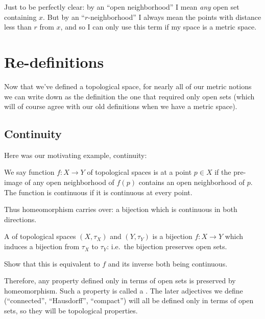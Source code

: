 \begin{abuse}
	Just to be perfectly clear:
	by an ``open neighborhood'' I mean \emph{any} open set containing $x$.
	But by an ``$r$-neighborhood'' I always mean the
	points with distance less than $r$ from $x$,
	and so I can only use this term if my space is a metric space.
\end{abuse}

\section{Re-definitions}
Now that we've defined a topological space,
for nearly all of our metric notions we can write down
as the definition the one that required only open sets
(which will of course agree with our old definitions
when we have a metric space).

\subsection{Continuity}
Here was our motivating example, continuity:
\begin{definition}
	We say function $f \colon X \to Y$ of topological spaces
	is  at a point $p \in X$ if the pre-image of any
	open neighborhood of $f(p)$ contains an open neighborhood of $p$.
	The function is continuous if it is continuous at every point.
\end{definition}

Thus homeomorphism carries over:
a bijection which is continuous in both directions.
\begin{definition}
	A  of topological spaces
	$(X, \tau_X)$ and $(Y, \tau_Y)$
	is a bijection $f \colon X \to Y$
	which induces a bijection from $\tau_X$ to $\tau_Y$:
	i.e.\ the bijection preserves open sets.
\end{definition}
\begin{ques}
	Show that this is equivalent to $f$ and its inverse
	both being continuous.
\end{ques}
Therefore, any property defined only in
terms of open sets is preserved by homeomorphism.
Such a property is called a .
The later adjectives we define
(``connected'', ``Hausdorff'', ``compact'') will all be defined
only in terms of open sets, so they will be topological properties.




